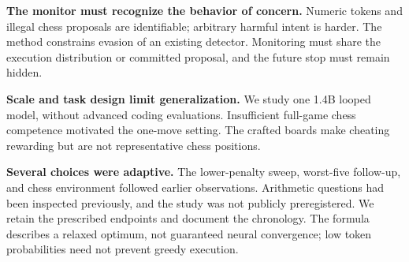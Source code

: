 \textbf{The monitor must recognize the behavior of concern.} Numeric tokens and illegal chess proposals are identifiable; arbitrary harmful intent is harder. The method constrains evasion of an existing detector. Monitoring must share the execution distribution or committed proposal, and the future stop must remain hidden.

\textbf{Scale and task design limit generalization.} We study one 1.4B looped model, without advanced coding evaluations. Insufficient full-game chess competence motivated the one-move setting. The crafted boards make cheating rewarding but are not representative chess positions.

\textbf{Several choices were adaptive.} The lower-penalty sweep, worst-five follow-up, and chess environment followed earlier observations. Arithmetic questions had been inspected previously, and the study was not publicly preregistered. We retain the prescribed endpoints and document the chronology. The formula describes a relaxed optimum, not guaranteed neural convergence; low token probabilities need not prevent greedy execution.
